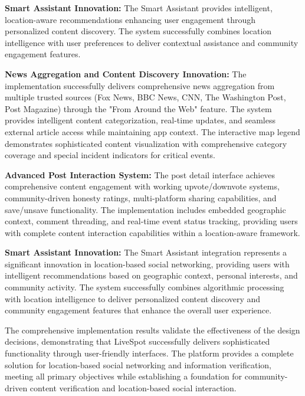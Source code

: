 \textbf{Smart Assistant Innovation:}
The Smart Assistant provides intelligent, location-aware recommendations enhancing user engagement through personalized content discovery. The system successfully combines location intelligence with user preferences to deliver contextual assistance and community engagement features.

\textbf{News Aggregation and Content Discovery Innovation:}
The implementation successfully delivers comprehensive news aggregation from multiple trusted sources (Fox News, BBC News, CNN, The Washington Post, Post Magazine) through the "From Around the Web" feature. The system provides intelligent content categorization, real-time updates, and seamless external article access while maintaining app context. The interactive map legend demonstrates sophisticated content visualization with comprehensive category coverage and special incident indicators for critical events.

\textbf{Advanced Post Interaction System:}
The post detail interface achieves comprehensive content engagement with working upvote/downvote systems, community-driven honesty ratings, multi-platform sharing capabilities, and save/unsave functionality. The implementation includes embedded geographic context, comment threading, and real-time event status tracking, providing users with complete content interaction capabilities within a location-aware framework.

\textbf{Smart Assistant Innovation:}
The Smart Assistant integration represents a significant innovation in location-based social networking, providing users with intelligent recommendations based on geographic context, personal interests, and community activity. The system successfully combines algorithmic processing with location intelligence to deliver personalized content discovery and community engagement features that enhance the overall user experience.

The comprehensive implementation results validate the effectiveness of the design decisions, demonstrating that LiveSpot successfully delivers sophisticated functionality through user-friendly interfaces. The platform provides a complete solution for location-based social networking and information verification, meeting all primary objectives while establishing a foundation for community-driven content verification and location-based social interaction.
